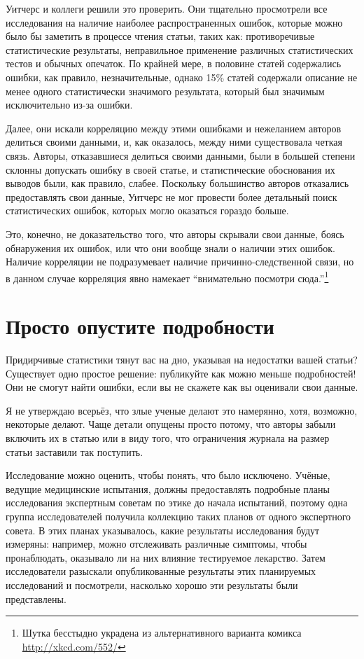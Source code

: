 Уитчерс и коллеги решили это проверить. Они тщательно просмотрели все исследования на наличие наиболее распространенных ошибок, которые можно было бы заметить в процессе чтения статьи, таких как: противоречивые статистические результаты, неправильное применение различных статистических тестов и обычных опечаток. По крайней мере, в половине статей содержались ошибки, как правило, незначительные, однако 15\% статей содержали описание не менее одного статистически значимого результата, который был значимым исключительно из-за ошибки. 

Далее, они искали корреляцию между этими ошибками и нежеланием авторов делиться своими данными, и, как оказалось, между ними существовала четкая связь. Авторы, отказавшиеся делиться своими данными, были в большей степени склонны допускать ошибку в своей статье, и статистические обоснования их выводов были, как правило, слабее. \cite{wicherts_willingness_2011} Поскольку большинство авторов отказались предоставлять свои данные, Уитчерс не мог провести более детальный поиск статистических ошибок, которых могло оказаться гораздо больше.

Это, конечно, не доказательство того, что авторы скрывали свои данные, боясь обнаружения их ошибок, или что они вообще знали о наличии этих ошибок. Наличие корреляции не подразумевает наличие причинно-следственной связи, но в данном случае корреляция явно намекает ``внимательно посмотри сюда.''\footnote{Шутка бесстыдно украдена из альтернативного варианта комикса \href{http://xkcd.com/552/}{http://xkcd.com/552/}}



\section{Просто опустите подробности}
\label{chp10:leaveoutdetails}

Придирчивые статистики тянут вас на дно, указывая на недостатки вашей статьи? Существует одно простое решение: публикуйте как можно меньше подробностей! Они не смогут найти ошибки, если вы не скажете как вы оценивали свои данные.

Я не утверждаю всерьёз, что злые ученые делают это намерянно, хотя, возможно, некоторые делают. Чаще детали опущены просто потому, что авторы забыли включить их в статью или в виду того, что ограничения журнала на размер статьи заставили так поступить.

Исследование можно оценить, чтобы понять, что было исключено. Учёные, ведущие медицинские испытания, должны предоставлять подробные планы исследования экспертным советам по этике до начала испытаний, поэтому одна группа исследователей получила коллекцию таких планов от одного  экспертного совета. В этих планах указывалось, какие результаты исследования будут измеряны: например, можно отслеживать различные симптомы, чтобы пронаблюдать, оказывало ли на них влияние тестируемое лекарство. Затем исследователи разыскали опубликованные результаты этих планируемых исследований и посмотрели, насколько хорошо эти результаты были представлены.   

